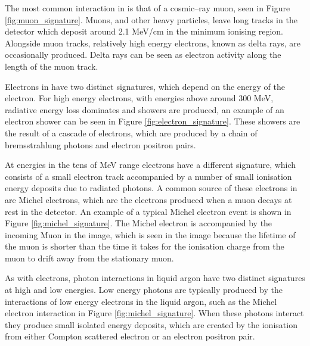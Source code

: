 The most common interaction in \protodune{} is that of a cosmic--ray muon, seen
in Figure \ref{fig:muon_signature}. Muons, and other heavy particles, leave 
long tracks in the detector which deposit around 2.1 MeV/cm in the minimum 
ionising region. Alongside muon tracks, relatively high energy electrons, 
known as delta rays, are occasionally produced. Delta rays can be seen as 
electron activity along the length of the muon track.

Electrons in \protodune{} have two distinct signatures, which depend on the
energy of the electron. For high energy electrons, with energies above around
300 MeV, radiative energy loss dominates and showers are produced, an example 
of an electron shower can be seen in Figure \ref{fig:electron_signature}. 
These showers are the result of a cascade of electrons, which are produced by 
a chain of bremsstrahlung photons and electron positron pairs.

At energies in the tens of MeV range electrons have a different signature, 
which consists of a small electron track accompanied by a number of small 
ionisation energy deposits due to radiated photons. A common source of these
electrons in \protodune{} are Michel electrons, which are the electrons produced
when a muon decays at rest in the detector. An example of a typical Michel
electron event is shown in Figure \ref{fig:michel_signature}. The Michel 
electron is accompanied by the incoming Muon in the image, which is seen in the
image because the lifetime of the muon is shorter than the time it takes for 
the ionisation charge from the muon to drift away from the stationary muon.

As with electrons, photon interactions in liquid argon have two distinct
signatures at high and low energies. Low energy photons are typically produced
by the interactions of low energy electrons in the liquid argon, such as the
Michel electron interaction in Figure \ref{fig:michel_signature}. When these 
photons interact they produce small isolated energy deposits, which are 
created by the ionisation from either Compton scattered electron or an electron 
positron pair.

